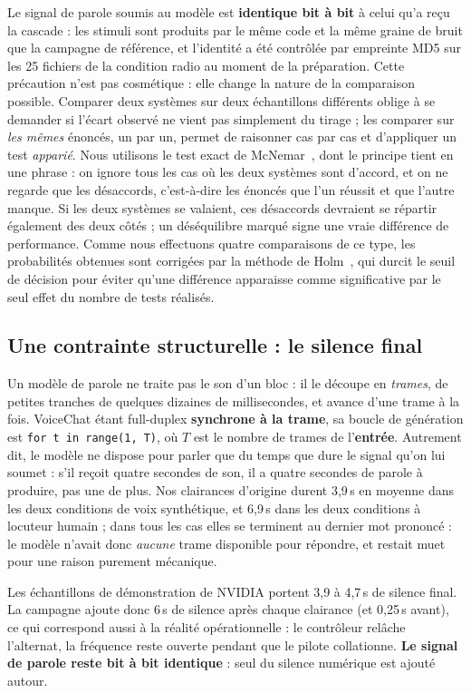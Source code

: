 \documentclass[11pt,a4paper]{article}
\begin{document}
Le signal de parole soumis au modèle est \textbf{identique bit à bit} à celui
qu'a reçu la cascade : les stimuli sont produits par le même code et la même
graine de bruit que la campagne de référence, et l'identité a été contrôlée par
empreinte MD5 sur les 25 fichiers de la condition radio au moment de la
préparation. Cette précaution n'est pas cosmétique : elle change la
nature de la comparaison possible. Comparer deux systèmes sur deux échantillons
différents oblige à se demander si l'écart observé ne vient pas simplement du
tirage ; les comparer sur \emph{les mêmes} énoncés, un par un, permet de
raisonner cas par cas et d'appliquer un test \emph{apparié}. Nous utilisons le
test exact de McNemar~\cite{mcnemar}, dont le principe tient en une phrase : on ignore tous les
cas où les deux systèmes sont d'accord, et on ne regarde que les désaccords,
c'est-à-dire les énoncés que l'un réussit et que l'autre manque. Si les deux
systèmes se valaient, ces désaccords devraient se répartir également des deux
côtés ; un déséquilibre marqué signe une vraie différence de performance. Comme
nous effectuons quatre comparaisons de ce type, les probabilités obtenues sont
corrigées par la méthode de Holm~\cite{holm}, qui durcit le seuil de décision pour éviter
qu'une différence apparaisse comme significative par le seul effet du nombre de
tests réalisés.

\subsection{Une contrainte structurelle : le silence final}

\begin{redbox}
Un modèle de parole ne traite pas le son d'un bloc : il le découpe en
\emph{trames}, de petites tranches de quelques dizaines de millisecondes, et
avance d'une trame à la fois. VoiceChat étant full-duplex \textbf{synchrone à la
trame}, sa boucle de génération est \texttt{for t in range(1, T)}, où $T$ est le
nombre de trames de l'\textbf{entrée}. Autrement dit, le modèle ne dispose pour
parler que du temps que dure le signal qu'on lui soumet : s'il reçoit quatre
secondes de son, il a quatre secondes de parole à produire, pas une de plus. Nos
clairances d'origine durent 3,9\,s en moyenne dans les deux conditions de voix
synthétique, et 6,9\,s dans les deux conditions à locuteur humain ; dans tous
les cas elles se terminent au dernier mot prononcé : le
modèle n'avait donc \emph{aucune} trame disponible pour répondre, et restait
muet pour une raison purement mécanique.

Les échantillons de démonstration de NVIDIA portent 3,9 à 4,7\,s de silence
final. La campagne ajoute donc 6\,s de silence après chaque clairance (et
0,25\,s avant), ce qui correspond aussi à la réalité opérationnelle : le
contrôleur relâche l'alternat, la fréquence reste ouverte pendant que le pilote
collationne. \textbf{Le signal de parole reste bit à bit identique} : seul du
silence numérique est ajouté autour.
\end{redbox}
\end{document}
